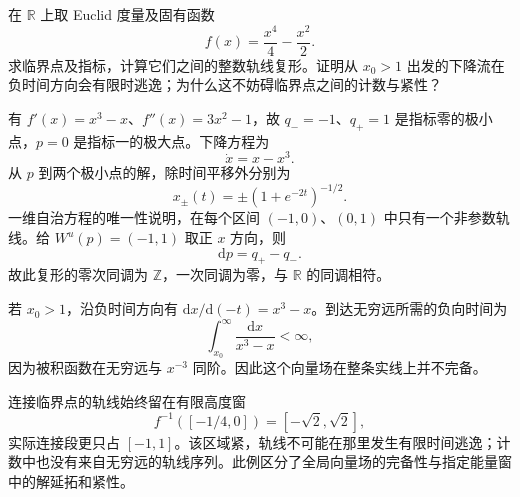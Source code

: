 \begin{exercise}\label{g2:ex:proper-window-incomplete-flow}
	在 \(\mathbb R\) 上取 Euclid 度量及固有函数
	\[
		f(x)=\frac{x^4}{4}-\frac{x^2}{2}.
	\]
	求临界点及指标，计算它们之间的整数轨线复形。证明从 \(x_0>1\) 出发的下降流在负时间方向会有限时逃逸；为什么这不妨碍临界点之间的计数与紧性？
\end{exercise}
\begin{solution}
	有 \(f'(x)=x^3-x\)、\(f''(x)=3x^2-1\)，故 \(q_-=-1\)、\(q_+=1\) 是指标零的极小点，\(p=0\) 是指标一的极大点。下降方程为
	\[
		\dot x=x-x^3.
	\]
	从 \(p\) 到两个极小点的解，除时间平移外分别为
	\[
		x_\pm(t)=\pm(1+e^{-2t})^{-1/2}.
	\]
	一维自治方程的唯一性说明，在每个区间 \((-1,0)\)、\((0,1)\) 中只有一个非参数轨线。给 \(W^u(p)=(-1,1)\) 取正 \(x\) 方向，则
	\[
		\mathrm dp=q_+-q_-.
	\]
	故此复形的零次同调为 \(\mathbb Z\)，一次同调为零，与 \(\mathbb R\) 的同调相符。

	若 \(x_0>1\)，沿负时间方向有 \(\mathrm dx/\mathrm d(-t)=x^3-x\)。到达无穷远所需的负向时间为
	\[
		\int_{x_0}^{\infty}\frac{\mathrm dx}{x^3-x}<\infty,
	\]
	因为被积函数在无穷远与 \(x^{-3}\) 同阶。因此这个向量场在整条实线上并不完备。

	连接临界点的轨线始终留在有限高度窗
	\[
		f^{-1}([-1/4,0])=[-\sqrt2,\sqrt2],
	\]
	实际连接段更只占 \([-1,1]\)。该区域紧，轨线不可能在那里发生有限时间逃逸；计数中也没有来自无穷远的轨线序列。此例区分了全局向量场的完备性与指定能量窗中的解延拓和紧性。
\end{solution}
